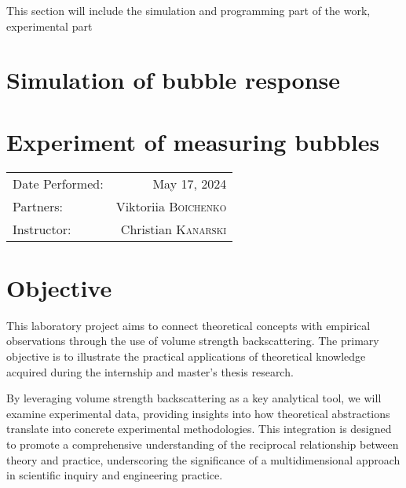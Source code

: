 This section will include the simulation and programming part of the work, experimental part

\section{Simulation of bubble response}

\section{Experiment of measuring bubbles}


\begin{center}
	\begin{tabular}{l r}
		Date Performed: & May 17, 2024 \\ %
		Partners: & Viktoriia \textsc{Boichenko} \\
		Instructor: & Christian \textsc{Kanarski} %
	\end{tabular}
\end{center}



\section{Objective}

This laboratory project aims to connect theoretical concepts with empirical observations through the use of volume strength backscattering. The primary objective is to illustrate the practical applications of theoretical knowledge acquired during the internship and master’s thesis research. 

By leveraging volume strength backscattering as a key analytical tool, we will examine experimental data, providing insights into how theoretical abstractions translate into concrete experimental methodologies. This integration is designed to promote a comprehensive understanding of the reciprocal relationship between theory and practice, underscoring the significance of a multidimensional approach in scientific inquiry and engineering practice.

